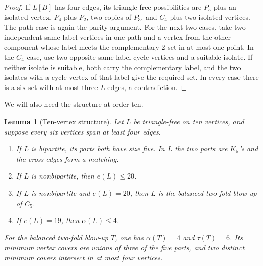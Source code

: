 \documentclass[11pt,reqno,a4paper]{amsart}
\newtheorem{lemma}[theorem]{Lemma}
\theoremstyle{definition}
\theoremstyle{remark}
\newcommand{\comp}[1]{\overline{#1}}
\begin{document}
\begin{proof}
If $L[B]$ has four edges, its triangle-free possibilities are $P_5$ plus an
isolated vertex, $P_4$ plus $P_2$, two copies of $P_3$, and $C_4$ plus two
isolated vertices.  The path case is again the parity argument.  For the
next two cases, take two independent same-label vertices in one path and a
vertex from the other component whose label meets the complementary 2-set
in at most one point.  In the $C_4$ case, use two opposite same-label cycle
vertices and a suitable isolate.  If neither isolate is suitable, both
carry the complementary label, and the two isolates with a cycle vertex of
that label give the required set.  In every case there is a six-set with at
most three $L$-edges, a contradiction.
\end{proof}

We will also need the structure at order ten.

\begin{lemma}[Ten-vertex structure]\label{lem:ten-structure}
Let $L$ be triangle-free on ten vertices, and suppose every six vertices
span at least four edges.
\begin{enumerate}[label=\textup{(\roman*)}]
\item If $L$ is bipartite, its parts both have size five.  In $\comp L$ the
two parts are $K_5$'s and the cross-edges form a matching.
\item If $L$ is nonbipartite, then $e(L)\leq20$.
\item If $L$ is nonbipartite and $e(L)=20$, then $L$ is the balanced
two-fold blow-up of $C_5$.
\item If $e(L)=19$, then $\alpha(L)\leq4$.
\end{enumerate}
For the balanced two-fold blow-up $T$, one has $\alpha(T)=4$ and
$\tau(T)=6$.  Its minimum vertex covers are unions of three of the five
parts, and two distinct minimum covers intersect in at most four vertices.
\end{lemma}
\end{document}
